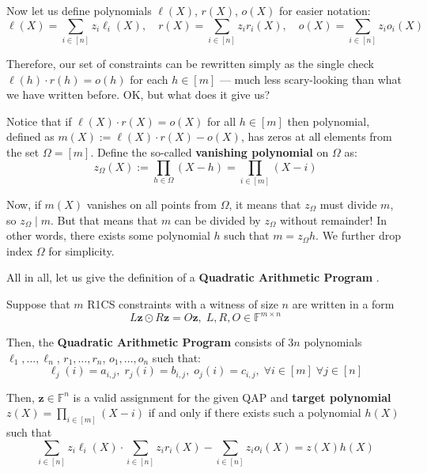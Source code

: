 \documentclass[../lecture-notes-148x210.tex]{subfiles}
\begin{document}
Now let us define polynomials $\ell(X)$, $r(X)$, $o(X)$ for easier notation: 
\begin{equation*}
    \ell(X) = \sum_{i \in [n]} z_i\ell_i(X), \quad r(X) = \sum_{i \in [n]} z_ir_i(X), \quad o(X) = \sum_{i \in [n]} z_io_i(X)
\end{equation*}

Therefore, our set of constraints can be rewritten simply as the single check
$\ell(h)\cdot r(h) = o(h)$ for each $h \in [m]$ --- much less scary-looking than
what we have written before. OK, but what does it give us? 

Notice that if $\ell(X) \cdot r(X)=o(X)$ for all $h \in [m]$ then polynomial,
defined as $m(X) := \ell(X) \cdot r(X) - o(X)$, has zeros at all elements from
the set $\Omega = [m]$. Define the so-called \textbf{vanishing polynomial} on
$\Omega$ as:
\begin{equation*}
    z_{\Omega}(X) := \prod_{h \in \Omega} (X - h) = \prod_{i \in [m]} (X - i)
\end{equation*} 

Now, if $m(X)$ vanishes on all points from $\Omega$, it means that $z_{\Omega}$
must divide $m$, so $z_{\Omega} \mid m$. But that means that $m$ can be divided
by $z_{\Omega}$ without remainder! In other words, there exists some polynomial
$h$ such that $m=z_{\Omega}h$. We further drop index $\Omega$ for simplicity. 

All in all, let us give the definition of a \textbf{Quadratic Arithmetic Program} \cite{qap}.

\begin{definition}
    Suppose that $m$ R1CS constraints with a witness of size $n$ are written in a form
    \begin{equation*}
        L\mathbf{z} \odot R\mathbf{z} = O\mathbf{z}, \; L,R,O \in \mathbb{F}^{m \times n}
    \end{equation*}

    Then, the \textbf{Quadratic Arithmetic Program} consists of $3n$ polynomials
    $\ell_1,\dots,\ell_n$, $r_1,\dots,r_n$, $o_1,\dots,o_n$ such that:
    \begin{equation*}
        \ell_j(i) = a_{i,j}, \; r_j(i) = b_{i,j}, \; o_j(i) = c_{i,j}, \; \forall i \in [m] \; \forall j \in [n]
    \end{equation*}

    Then, $\mathbf{z} \in \mathbb{F}^n$ is a valid assignment for the given QAP
    and \textbf{target polynomial} $z(X) = \prod_{i \in [m]} (X-i)$ if and only
    if there exists such a polynomial $h(X)$ such that
    \begin{equation*}
        \sum_{i \in [n]} z_i\ell_i(X) \cdot \sum_{i \in [n]} z_ir_i(X) - \sum_{i \in [n]} z_io_i(X) = z(X)h(X)
    \end{equation*}
\end{definition}
\end{document}
